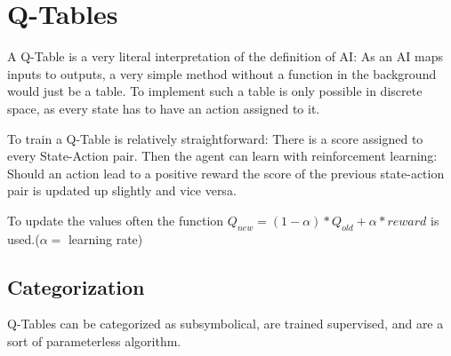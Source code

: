 \section{Q-Tables}
\label{sec:QTable}
A Q-Table is a very literal interpretation of the definition of AI: As an AI maps inputs to outputs, a very simple method without a function in the background would just be a table. To implement such a table is only possible in discrete space, as every state has to have an action assigned to it.

To train a Q-Table is relatively straightforward: There is a score assigned to every State-Action pair. Then the agent can learn with reinforcement learning: Should an action lead to a positive reward the score of the previous state-action pair is updated up slightly and vice versa.

To update the values often the function $Q_{new}=(1-\alpha)*Q_{old}+\alpha*reward$ is used.($\alpha=$ learning rate)

\subsection{Categorization}
Q-Tables can be categorized as subsymbolical, are trained supervised, and are a sort of parameterless algorithm.